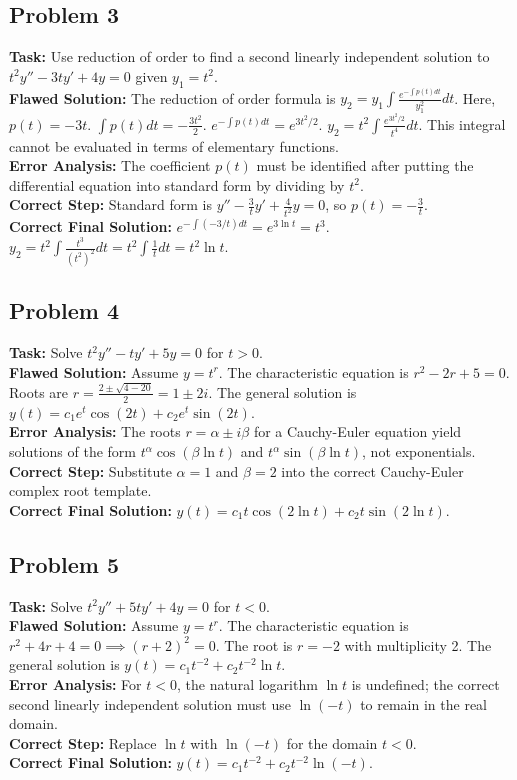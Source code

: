 \documentclass{article}
\begin{document}
\subsection{Problem 3}
\textbf{Task:} Use reduction of order to find a second linearly independent solution to $t^2 y'' - 3ty' + 4y = 0$ given $y_1 = t^2$. \\
\textbf{Flawed Solution:}
The reduction of order formula is $y_2 = y_1 \int \frac{e^{-\int p(t) dt}}{y_1^2} dt$.
Here, $p(t) = -3t$.
$\int p(t) dt = -\frac{3t^2}{2}$.
$e^{-\int p(t) dt} = e^{3t^2/2}$.
$y_2 = t^2 \int \frac{e^{3t^2/2}}{t^4} dt$. This integral cannot be evaluated in terms of elementary functions. \\
\textbf{Error Analysis:} The coefficient $p(t)$ must be identified after putting the differential equation into standard form by dividing by $t^2$. \\
\textbf{Correct Step:} Standard form is $y'' - \frac{3}{t}y' + \frac{4}{t^2}y = 0$, so $p(t) = -\frac{3}{t}$. \\
\textbf{Correct Final Solution:} $e^{-\int (-3/t) dt} = e^{3 \ln t} = t^3$. $y_2 = t^2 \int \frac{t^3}{(t^2)^2} dt = t^2 \int \frac{1}{t} dt = t^2 \ln t$.

\subsection{Problem 4}
\textbf{Task:} Solve $t^2 y'' - ty' + 5y = 0$ for $t > 0$. \\
\textbf{Flawed Solution:}
Assume $y = t^r$. The characteristic equation is $r^2 - 2r + 5 = 0$.
Roots are $r = \frac{2 \pm \sqrt{4 - 20}}{2} = 1 \pm 2i$.
The general solution is $y(t) = c_1 e^t \cos(2t) + c_2 e^t \sin(2t)$. \\
\textbf{Error Analysis:} The roots $r = \alpha \pm i\beta$ for a Cauchy-Euler equation yield solutions of the form $t^\alpha \cos(\beta \ln t)$ and $t^\alpha \sin(\beta \ln t)$, not exponentials. \\
\textbf{Correct Step:} Substitute $\alpha = 1$ and $\beta = 2$ into the correct Cauchy-Euler complex root template. \\
\textbf{Correct Final Solution:} $y(t) = c_1 t \cos(2 \ln t) + c_2 t \sin(2 \ln t)$.

\subsection{Problem 5}
\textbf{Task:} Solve $t^2 y'' + 5ty' + 4y = 0$ for $t < 0$. \\
\textbf{Flawed Solution:}
Assume $y = t^r$. The characteristic equation is $r^2 + 4r + 4 = 0 \implies (r+2)^2 = 0$.
The root is $r = -2$ with multiplicity 2.
The general solution is $y(t) = c_1 t^{-2} + c_2 t^{-2} \ln t$. \\
\textbf{Error Analysis:} For $t < 0$, the natural logarithm $\ln t$ is undefined; the correct second linearly independent solution must use $\ln(-t)$ to remain in the real domain. \\
\textbf{Correct Step:} Replace $\ln t$ with $\ln(-t)$ for the domain $t < 0$. \\
\textbf{Correct Final Solution:} $y(t) = c_1 t^{-2} + c_2 t^{-2} \ln(-t)$.
\end{document}

